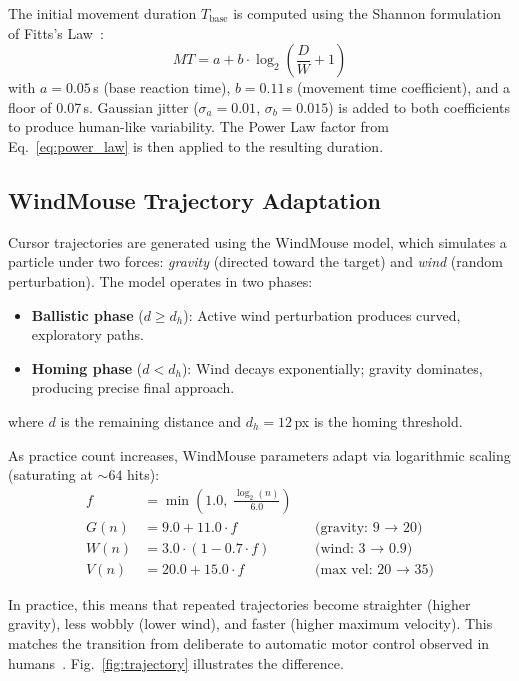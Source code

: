 \documentclass[conference]{IEEEtran}
\begin{document}
The initial movement duration $T_{\text{base}}$ is computed using the Shannon formulation of Fitts's Law~\cite{fitts1954,mackenzie1992}:
\begin{equation}
    MT = a + b \cdot \log_2\!\left(\frac{D}{W} + 1\right)
    \label{eq:fitts}
\end{equation}
with $a = 0.05$\,s (base reaction time), $b = 0.11$\,s (movement time coefficient), and a floor of 0.07\,s. Gaussian jitter ($\sigma_a = 0.01$, $\sigma_b = 0.015$) is added to both coefficients to produce human-like variability. The Power Law factor from Eq.~\ref{eq:power_law} is then applied to the resulting duration.

\subsection{WindMouse Trajectory Adaptation}

Cursor trajectories are generated using the WindMouse model, which simulates a particle under two forces: \emph{gravity} (directed toward the target) and \emph{wind} (random perturbation). The model operates in two phases:

\begin{itemize}[noitemsep,topsep=0pt]
    \item \textbf{Ballistic phase} ($d \geq d_h$): Active wind perturbation produces curved, exploratory paths.
    \item \textbf{Homing phase} ($d < d_h$): Wind decays exponentially; gravity dominates, producing precise final approach.
\end{itemize}

where $d$ is the remaining distance and $d_h = 12$\,px is the homing threshold.

As practice count increases, WindMouse parameters adapt via logarithmic scaling (saturating at ${\sim}64$ hits):
\begin{align}
    f &= \min\!\left(1.0,\; \frac{\log_2(n)}{6.0}\right) \label{eq:factor} \\
    G(n) &= 9.0 + 11.0 \cdot f  &&\text{(gravity: 9 $\to$ 20)} \label{eq:gravity} \\
    W(n) &= 3.0 \cdot (1 - 0.7 \cdot f) &&\text{(wind: 3 $\to$ 0.9)} \label{eq:wind} \\
    V(n) &= 20.0 + 15.0 \cdot f &&\text{(max vel: 20 $\to$ 35)} \label{eq:maxvel}
\end{align}

In practice, this means that repeated trajectories become straighter (higher gravity), less wobbly (lower wind), and faster (higher maximum velocity). This matches the transition from deliberate to automatic motor control observed in humans~\cite{willingham1998}. Fig.~\ref{fig:trajectory} illustrates the difference.
\end{document}
